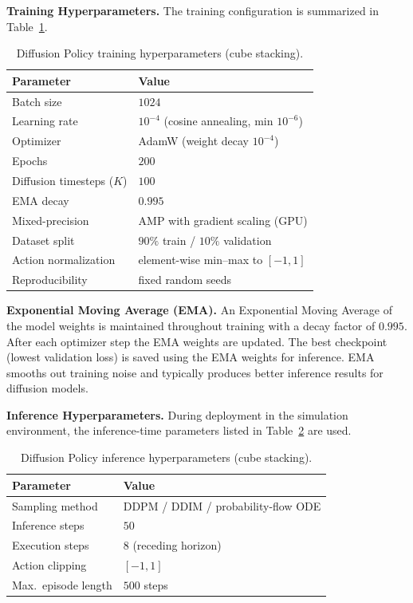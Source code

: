 \documentclass[11pt,a4paper]{article}
\begin{document}
\textbf{Training Hyperparameters.}
The training configuration is summarized in Table~\ref{tab:diff_train_hyperparams}.

\begin{table}[htbp]
  \centering
  \caption{Diffusion Policy training hyperparameters (cube stacking).}
  \label{tab:diff_train_hyperparams}
  \begin{tabular}{@{}ll@{}}
    \toprule
    \textbf{Parameter} & \textbf{Value} \\
    \midrule
    Batch size                & $1024$ \\
    Learning rate             & $10^{-4}$ (cosine annealing, min $10^{-6}$) \\
    Optimizer                 & AdamW (weight decay $10^{-4}$) \\
    Epochs                    & $200$ \\
    Diffusion timesteps ($K$) & $100$ \\
    EMA decay                 & $0.995$ \\
    Mixed-precision           & AMP with gradient scaling (GPU) \\
    Dataset split             & $90\%$ train / $10\%$ validation \\
    Action normalization      & element-wise min--max to $[-1,1]$ \\
    Reproducibility           & fixed random seeds \\
    \bottomrule
  \end{tabular}
\end{table}

\textbf{Exponential Moving Average (EMA).}
An Exponential Moving Average of the model weights is maintained throughout training with a decay factor of $0.995$. After each optimizer step the EMA weights are updated. The best checkpoint (lowest validation loss) is saved using the EMA weights for inference. EMA smooths out training noise and typically produces better inference results for diffusion models.

\textbf{Inference Hyperparameters.}
During deployment in the simulation environment, the inference-time parameters listed in Table~\ref{tab:diff_inference_hyperparams} are used.

\begin{table}[htbp]
  \centering
  \caption{Diffusion Policy inference hyperparameters (cube stacking).}
  \label{tab:diff_inference_hyperparams}
  \begin{tabular}{@{}ll@{}}
    \toprule
    \textbf{Parameter} & \textbf{Value} \\
    \midrule
    Sampling method      & DDPM / DDIM / probability-flow ODE \\
    Inference steps      & $50$ \\
    Execution steps      & $8$ (receding horizon) \\
    Action clipping      & $[-1,1]$ \\
    Max.\ episode length & $500$ steps \\
    \bottomrule
  \end{tabular}
\end{table}
\end{document}
